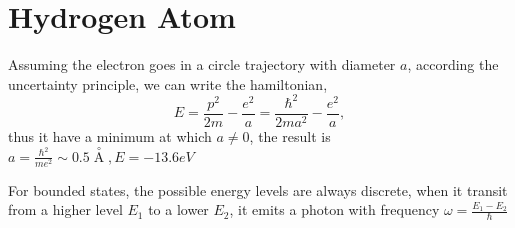 \section{Hydrogen Atom}
Assuming the electron goes in a circle trajectory with diameter $a$, according the uncertainty principle, we can write the hamiltonian,
\begin{equation}
  E = \frac{p^2}{2m} - \frac{e^2}{a} = \frac{\hbar^2}{2ma^2} - \frac{e^2}{a},
\end{equation}
thus it have a minimum at which $a\neq 0$, the result is $a = \frac{\hbar^2}{me^2} \sim 0.5 \mathop{A}\limits^{\circ}_{}, E = -13.6 eV$

For bounded states, the possible energy levels are always discrete, when it transit from a higher level $E_1$ to a lower $E_2$, it emits a photon with frequency $\omega = \frac{E_1 - E_2}{\hbar}$